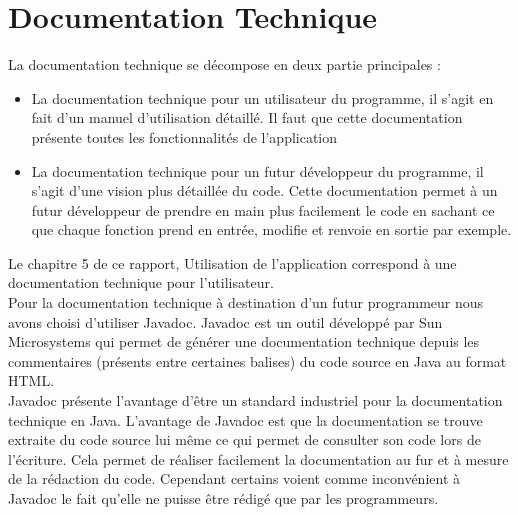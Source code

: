 \section{Documentation Technique}

La documentation technique se décompose en deux partie principales : 

\begin{itemize}
\item La documentation technique pour un utilisateur du programme, il s'agit en fait d'un manuel d'utilisation détaillé. Il faut que cette documentation présente toutes les fonctionnalités de l'application
\item La documentation technique pour un futur développeur du programme, il s'agit d'une vision plus détaillée du code. Cette documentation permet à un futur développeur de prendre en main plus facilement le code en sachant ce que chaque fonction prend en entrée, modifie et renvoie en sortie par exemple. 
\end{itemize}

Le chapitre 5 de ce rapport, Utilisation de l'application correspond à une documentation technique pour l'utilisateur. \\

Pour la documentation technique à destination d'un futur programmeur nous avons choisi d'utiliser Javadoc. Javadoc est un outil développé par Sun Microsystems qui permet de générer une documentation technique depuis les commentaires (présents entre certaines balises) du code source en Java au format HTML. \\

Javadoc présente l'avantage d'être un standard industriel pour la documentation technique en Java. L'avantage de Javadoc est que la documentation se trouve extraite du code source lui même ce qui permet de consulter son code lors de l'écriture. Cela permet de réaliser facilement la documentation au fur et à mesure de la rédaction du code. Cependant certains voient comme inconvénient à Javadoc le fait qu'elle ne puisse être rédigé que par les programmeurs. 